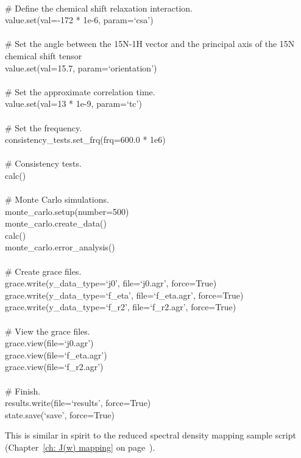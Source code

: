 \begin{exampleenv}
 \\
\# Define the chemical shift relaxation interaction. \\
value.set(val=-172 * 1e-6, param=`csa') \\
 \\
\# Set the angle between the 15N-1H vector and the principal axis of the 15N chemical shift tensor \\
value.set(val=15.7, param=`orientation') \\
 \\
\# Set the approximate correlation time. \\
value.set(val=13 * 1e-9, param=`tc') \\
 \\
\# Set the frequency. \\
consistency\_tests.set\_frq(frq=600.0 * 1e6) \\
 \\
\# Consistency tests. \\
calc() \\
 \\
\# Monte Carlo simulations. \\
monte\_carlo.setup(number=500) \\
monte\_carlo.create\_data() \\
calc() \\
monte\_carlo.error\_analysis() \\
 \\
\# Create grace files. \\
grace.write(y\_data\_type=`j0', file=`j0.agr', force=True) \\
grace.write(y\_data\_type=`f\_eta', file=`f\_eta.agr', force=True) \\
grace.write(y\_data\_type=`f\_r2', file=`f\_r2.agr', force=True) \\
 \\
\# View the grace files. \\
grace.view(file=`j0.agr') \\
grace.view(file=`f\_eta.agr') \\
grace.view(file=`f\_r2.agr') \\
 \\
\# Finish. \\
results.write(file=`results', force=True) \\
state.save(`save', force=True)
\end{exampleenv}

This is similar in spirit to the reduced spectral density mapping sample script (Chapter~\ref{ch: J(w) mapping} on page~\pageref{ch: J(w) mapping}).


